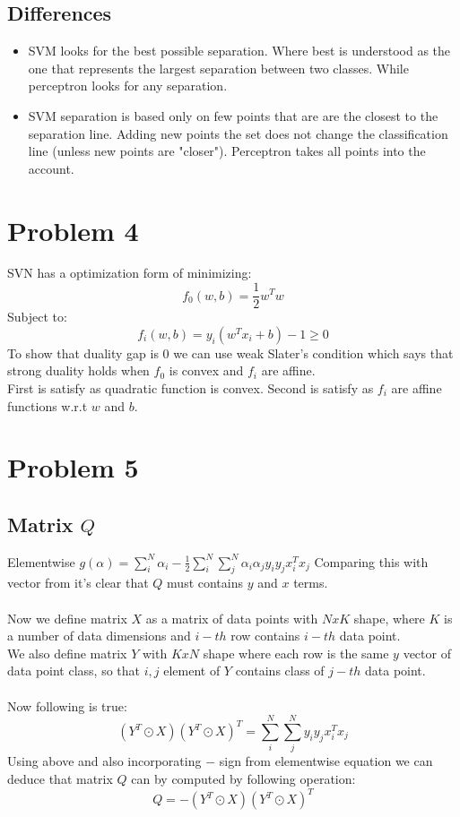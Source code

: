 \documentclass{article}
\begin{document}
\subsection{Differences}
\begin{itemize}
    \item SVM looks for the best possible separation. Where best is understood as
    the one that represents the largest separation between two classes. While perceptron
    looks for any separation.
    \item SVM separation is based only on few points that are are the closest to the separation line.
    Adding new points the set does not change the classification line (unless new points are "closer").
    Perceptron takes all points into the account.
\end{itemize}
\section{Problem 4}
SVN has a optimization form of minimizing:
\begin{equation}
    f_0(w,b)=\frac{1}{2} w^Tw
\end{equation}
Subject to:
\begin{equation}
    f_i(w,b) = y_i(w^Tx_i +b) - 1 \geq 0
\end{equation}
To show that duality gap is $0$ we can use weak Slater's condition which says
that strong duality holds when $f_0$ is convex and $f_i$ are affine.\\
First is satisfy as quadratic function is convex. Second is satisfy as $f_i$ are affine functions
w.r.t $w$ and $b$.
\section{Problem 5}
\subsection{Matrix $Q$}
Elementwise $g(\alpha) = \sum_i^N\alpha_i - \frac{1}{2} \sum_i^N\sum_j^N\alpha_i\alpha_jy_iy_jx_i^Tx_j$
Comparing this with vector from it's clear that $Q$ must contains $y$ and $x$ terms.
\\\\
Now we define matrix $X$ as a matrix of data points with $NxK$ shape, where $K$ is a 
number of data dimensions and $i-th$ row contains $i-th$ data point.\\
We also define matrix $Y$ with $KxN$ shape where each row is the same $y$ vector of data point class,
so that $i,j$ element of $Y$ contains class of $j-th$ data point.
\\\\
Now following is true:
\begin{equation}
    (Y^T \odot X)(Y^T \odot X)^T = \sum_i^N\sum_j^Ny_iy_jx_i^Tx_j
\end{equation}
Using above and also incorporating $-$ sign from elementwise equation we can deduce
that matrix $Q$ can by computed by following operation:
\begin{equation}
    Q = - (Y^T \odot X)(Y^T \odot X)^T
\end{equation}
\end{document}
